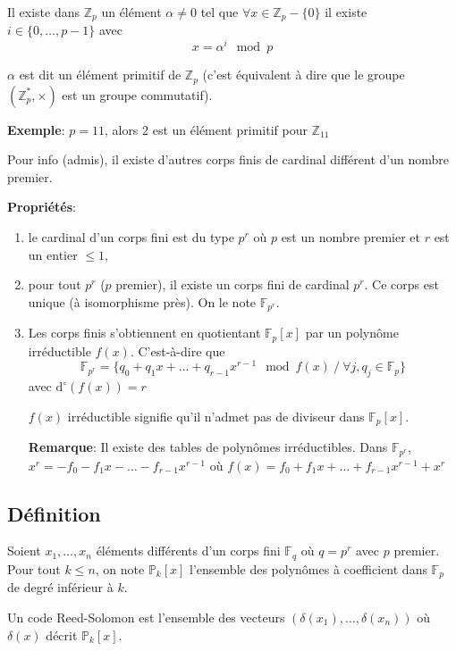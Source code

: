 \documentclass[a4paper,10pt,twocolumn]{article}
\theoremstyle{break}
\newcommand{\F}{\mathbb{F}}
\newcommand{\Poly}{\mathbb{P}}
\newcommand{\Zn}[1]{\mathbb{Z}_{#1}}
\newcommand{\Zp}{\Zn{p}}
\newcommand{\dg}[1]{\mathrm{d}^\circ(#1)}
\newenvironment{note}[1]
{\textbf{#1}:}
{}
\newenvironment{remarque}
{\begin{note}{Remarque}}
{\end{note}}
\newenvironment{proprietes}
{\begin{note}{Propriétés}}
{\end{note}}
\newenvironment{exemple}
{\begin{note}{Exemple}}
{\end{note}}
\begin{document}
Il existe dans $\Zp$ un élément $\alpha \ne 0$ tel que $\forall x \in \Zp - \{0\}$ 
il existe $i \in \{0, \ldots, p-1\}$ avec 
$$ x = \alpha^i \mod p$$

$\alpha$ est dit un élément primitif de $\Zp$ (c'est équivalent à dire que le groupe $(\Zp^*, \times)$ est un groupe commutatif).

\begin{exemple}
 $p=11$, alors 2 est un élément primitif pour $\Zn{11}$
\end{exemple}

Pour info (admis), il existe d'autres corps finis de cardinal différent d'un nombre premier.

\begin{proprietes}
 \begin{enumerate}
  \item le cardinal d'un corps fini est du type $p^r$ où $p$ est un nombre premier et $r$ est un entier $\le 1$,
  \item pour tout $p^r$ ($p$ premier), il existe un corps fini de cardinal $p^r$. Ce corps est unique 
   (à isomorphisme près). On le note $\F_{p^r}$.
  \item Les corps finis s'obtiennent en quotientant $\F_p[x]$ par un polynôme irréductible $f(x)$.
   C'est-à-dire que 
    $$\F_{p^r} = \{q_0 + q_1x + \ldots + q_{r-1}x^{r-1} \mod f(x)\ /\ \forall j, q_j \in \F_p\}$$ 
   avec $\dg{f(x)} = r$

   $f(x)$ irréductible signifie qu'il n'admet pas de diviseur dans $\F_p[x]$.
   
   \begin{remarque}
    Il existe des tables de polynômes irréductibles. Dans $\F_{p^r}$, $x^r = -f_0 -f_1 x - \ldots - f_{r-1} x^{r-1}$ 
    où $f(x) = f_0 + f_1 x + \ldots + f_{r-1} x^{r-1} + x^r$
   \end{remarque}
 \end{enumerate}
\end{proprietes}

\subsection{Définition}
Soient $x_1, \ldots, x_n$ éléments différents d'un corps fini $\F_q$ où $q=p^r$ avec $p$ premier. 
Pour tout $k \le n$, on note $\Poly_k[x]$ l'ensemble des polynômes à coefficient dans $\F_p$ de degré inférieur à $k$.

Un code Reed-Solomon est l'ensemble des vecteurs $(\delta(x_1), \ldots, \delta(x_n))$ où $\delta(x)$ décrit $\Poly_k[x]$.
\end{document}
